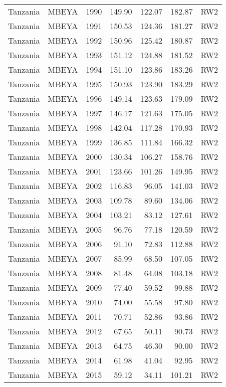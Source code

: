 \begin{longtable}{lllrrrl}
  Tanzania & MBEYA & 1990 & 149.90 & 122.07 & 182.87 & RW2 \\ 
  Tanzania & MBEYA & 1991 & 150.53 & 124.36 & 181.27 & RW2 \\ 
  Tanzania & MBEYA & 1992 & 150.96 & 125.42 & 180.87 & RW2 \\ 
  Tanzania & MBEYA & 1993 & 151.12 & 124.88 & 181.52 & RW2 \\ 
  Tanzania & MBEYA & 1994 & 151.10 & 123.86 & 183.26 & RW2 \\ 
  Tanzania & MBEYA & 1995 & 150.93 & 123.90 & 183.29 & RW2 \\ 
  Tanzania & MBEYA & 1996 & 149.14 & 123.63 & 179.09 & RW2 \\ 
  Tanzania & MBEYA & 1997 & 146.17 & 121.63 & 175.05 & RW2 \\ 
  Tanzania & MBEYA & 1998 & 142.04 & 117.28 & 170.93 & RW2 \\ 
  Tanzania & MBEYA & 1999 & 136.85 & 111.84 & 166.32 & RW2 \\ 
  Tanzania & MBEYA & 2000 & 130.34 & 106.27 & 158.76 & RW2 \\ 
  Tanzania & MBEYA & 2001 & 123.66 & 101.26 & 149.95 & RW2 \\ 
  Tanzania & MBEYA & 2002 & 116.83 & 96.05 & 141.03 & RW2 \\ 
  Tanzania & MBEYA & 2003 & 109.78 & 89.60 & 134.06 & RW2 \\ 
  Tanzania & MBEYA & 2004 & 103.21 & 83.12 & 127.61 & RW2 \\ 
  Tanzania & MBEYA & 2005 & 96.76 & 77.18 & 120.59 & RW2 \\ 
  Tanzania & MBEYA & 2006 & 91.10 & 72.83 & 112.88 & RW2 \\ 
  Tanzania & MBEYA & 2007 & 85.99 & 68.50 & 107.05 & RW2 \\ 
  Tanzania & MBEYA & 2008 & 81.48 & 64.08 & 103.18 & RW2 \\ 
  Tanzania & MBEYA & 2009 & 77.40 & 59.52 & 99.88 & RW2 \\ 
  Tanzania & MBEYA & 2010 & 74.00 & 55.58 & 97.80 & RW2 \\ 
  Tanzania & MBEYA & 2011 & 70.71 & 52.86 & 93.86 & RW2 \\ 
  Tanzania & MBEYA & 2012 & 67.65 & 50.11 & 90.73 & RW2 \\ 
  Tanzania & MBEYA & 2013 & 64.75 & 46.30 & 90.00 & RW2 \\ 
  Tanzania & MBEYA & 2014 & 61.98 & 41.04 & 92.95 & RW2 \\ 
  Tanzania & MBEYA & 2015 & 59.12 & 34.11 & 101.21 & RW2 \\ 

\end{longtable}
